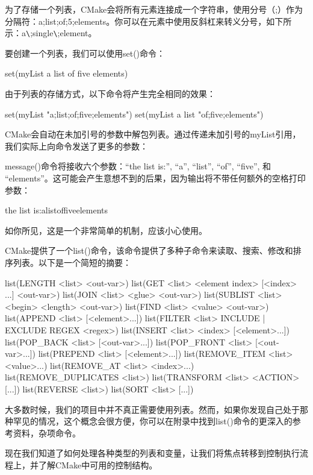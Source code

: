 
为了存储一个列表，CMake会将所有元素连接成一个字符串，使用分号（;）作为分隔符：a;list;of;5;elements。你可以在元素中使用反斜杠来转义分号，如下所示：a\verb|\|;single\verb|\|;element。


要创建一个列表，我们可以使用set()命令：

\begin{cmake}
set(myList a list of five elements)
\end{cmake}

由于列表的存储方式，以下命令将产生完全相同的效果：

\begin{cmake}
set(myList "a;list;of;five;elements")
set(myList a list "of;five;elements")
\end{cmake}

CMake会自动在未加引号的参数中解包列表。通过传递未加引号的myList引用，我们实际上向命令发送了更多的参数：


message()命令将接收六个参数：“the list is:”, “a”, “list”, “of”, “five”, 和 “elements”。这可能会产生意想不到的后果，因为输出将不带任何额外的空格打印参数：

\begin{shell}
the list is:alistoffiveelements
\end{shell}

如你所见，这是一个非常简单的机制，应该小心使用。

CMake提供了一个list()命令，该命令提供了多种子命令来读取、搜索、修改和排序列表。以下是一个简短的摘要：

\begin{cmake}
list(LENGTH <list> <out-var>)
list(GET <list> <element index> [<index> ...] <out-var>)
list(JOIN <list> <glue> <out-var>)
list(SUBLIST <list> <begin> <length> <out-var>)
list(FIND <list> <value> <out-var>)
list(APPEND <list> [<element>...])
list(FILTER <list> {INCLUDE | EXCLUDE} REGEX <regex>)
list(INSERT <list> <index> [<element>...])
list(POP_BACK <list> [<out-var>...])
list(POP_FRONT <list> [<out-var>...])
list(PREPEND <list> [<element>...])
list(REMOVE_ITEM <list> <value>...)
list(REMOVE_AT <list> <index>...)
list(REMOVE_DUPLICATES <list>)
list(TRANSFORM <list> <ACTION> [...])
list(REVERSE <list>)
list(SORT <list> [...])
\end{cmake}

大多数时候，我们的项目中并不真正需要使用列表。然而，如果你发现自己处于那种罕见的情况，这个概念会很方便，你可以在附录中找到list()命令的更深入的参考资料，杂项命令。

现在我们知道了如何处理各种类型的列表和变量，让我们将焦点转移到控制执行流程上，并了解CMake中可用的控制结构。
















